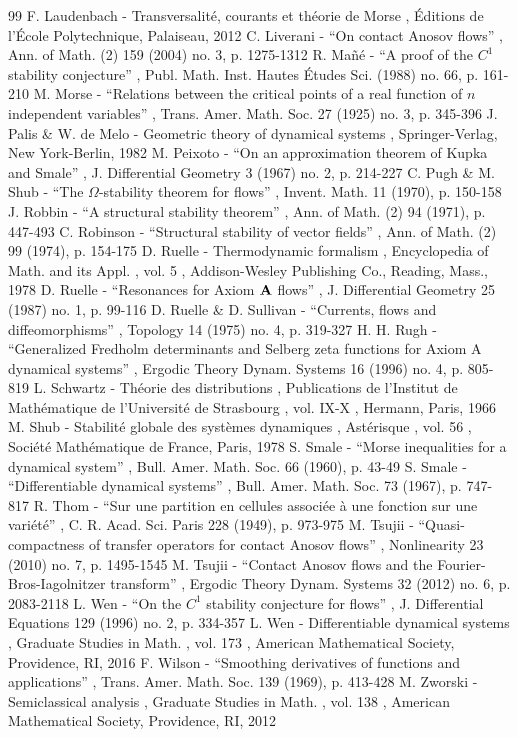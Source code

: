 \documentclass[11pt]{article}
\theoremstyle{definition}
\theoremstyle{plain}
\begin{document}
\begin{thebibliography}{99}
 F. Laudenbach - Transversalité, courants et théorie de Morse , Éditions de l’École Polytechnique, Palaiseau, 2012
 C. Liverani - “On contact Anosov flows” , Ann. of Math. (2) 159 (2004) no. 3, p. 1275-1312
 R. Mañé - “A proof of the $C^1$ stability conjecture” , Publ. Math. Inst. Hautes Études Sci. (1988) no. 66, p. 161-210
 M. Morse - “Relations between the critical points of a real function of $n$ independent variables” , Trans. Amer. Math. Soc. 27 (1925) no. 3, p. 345-396
 J. Palis \& W. de Melo - Geometric theory of dynamical systems , Springer-Verlag, New York-Berlin, 1982
 M. Peixoto - “On an approximation theorem of Kupka and Smale” , J. Differential Geometry 3 (1967) no. 2, p. 214-227
 C. Pugh \& M. Shub - “The $\Omega $-stability theorem for flows” , Invent. Math. 11 (1970), p. 150-158
 J. Robbin - “A structural stability theorem” , Ann. of Math. (2) 94 (1971), p. 447-493
 C. Robinson - “Structural stability of vector fields” , Ann. of Math. (2) 99 (1974), p. 154-175
 D. Ruelle - Thermodynamic formalism , Encyclopedia of Math. and its Appl. , vol. 5 , Addison-Wesley Publishing Co., Reading, Mass., 1978
 D. Ruelle - “Resonances for Axiom ${\bf A}$ flows” , J. Differential Geometry 25 (1987) no. 1, p. 99-116
 D. Ruelle \& D. Sullivan - “Currents, flows and diffeomorphisms” , Topology 14 (1975) no. 4, p. 319-327
 H. H. Rugh - “Generalized Fredholm determinants and Selberg zeta functions for Axiom A dynamical systems” , Ergodic Theory Dynam. Systems 16 (1996) no. 4, p. 805-819
 L. Schwartz - Théorie des distributions , Publications de l’Institut de Mathématique de l’Université de Strasbourg , vol. IX-X , Hermann, Paris, 1966
 M. Shub - Stabilité globale des systèmes dynamiques , Astérisque , vol. 56 , Société Mathématique de France, Paris, 1978
 S. Smale - “Morse inequalities for a dynamical system” , Bull. Amer. Math. Soc. 66 (1960), p. 43-49
 S. Smale - “Differentiable dynamical systems” , Bull. Amer. Math. Soc. 73 (1967), p. 747-817
 R. Thom - “Sur une partition en cellules associée à une fonction sur une variété” , C. R. Acad. Sci. Paris 228 (1949), p. 973-975
 M. Tsujii - “Quasi-compactness of transfer operators for contact Anosov flows” , Nonlinearity 23 (2010) no. 7, p. 1495-1545
 M. Tsujii - “Contact Anosov flows and the Fourier-Bros-Iagolnitzer transform” , Ergodic Theory Dynam. Systems 32 (2012) no. 6, p. 2083-2118
 L. Wen - “On the $C^1$ stability conjecture for flows” , J. Differential Equations 129 (1996) no. 2, p. 334-357
 L. Wen - Differentiable dynamical systems , Graduate Studies in Math. , vol. 173 , American Mathematical Society, Providence, RI, 2016
 F. Wilson - “Smoothing derivatives of functions and applications” , Trans. Amer. Math. Soc. 139 (1969), p. 413-428
 M. Zworski - Semiclassical analysis , Graduate Studies in Math. , vol. 138 , American Mathematical Society, Providence, RI, 2012
\end{thebibliography}
\end{document}
